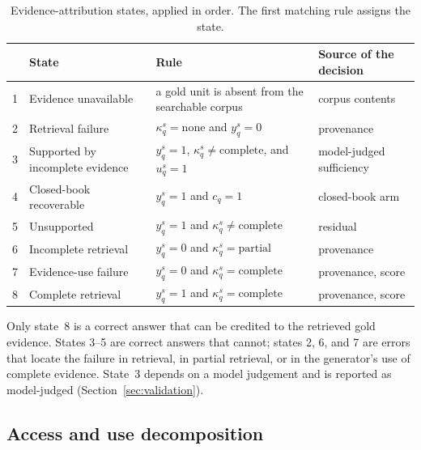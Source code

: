\documentclass[preprint,12pt]{elsarticle}
\begin{document}
\begin{table}[!tbp]
\centering
\caption{Evidence-attribution states, applied in order. The first matching
rule assigns the state.}
\label{tab:states}
\footnotesize
\begin{tabular}{@{}c>{\raggedright\arraybackslash}p{}>{\raggedright\arraybackslash}p{}>{\raggedright\arraybackslash}p{}@{}}
\toprule
& State & Rule & Source of the decision \\
\midrule
1 & Evidence unavailable & a gold unit is absent from the searchable corpus & corpus contents \\
2 & Retrieval failure & $\kappa_q^{s}=\text{none}$ and $y_q^{s}=0$ & provenance \\
3 & Supported by incomplete evidence & $y_q^{s}=1$, $\kappa_q^{s}\neq\text{complete}$, and $u_q^{s}=1$ & model-judged sufficiency \\
4 & Closed-book recoverable & $y_q^{s}=1$ and $c_q=1$ & closed-book arm \\
5 & Unsupported & $y_q^{s}=1$ and $\kappa_q^{s}\neq\text{complete}$ & residual \\
6 & Incomplete retrieval & $y_q^{s}=0$ and $\kappa_q^{s}=\text{partial}$ & provenance \\
7 & Evidence-use failure & $y_q^{s}=0$ and $\kappa_q^{s}=\text{complete}$ & provenance, score \\
8 & Complete retrieval & $y_q^{s}=1$ and $\kappa_q^{s}=\text{complete}$ & provenance, score \\
\bottomrule
\end{tabular}
\end{table}

Only state~8 is a correct answer that can be credited to the retrieved gold
evidence. States 3--5 are correct answers that cannot; states 2, 6, and 7 are
errors that locate the failure in retrieval, in partial retrieval, or in the
generator's use of complete evidence. State~3 depends on a model judgement and
is reported as model-judged (Section~\ref{sec:validation}).

\subsection{Access and use decomposition}
\end{document}
